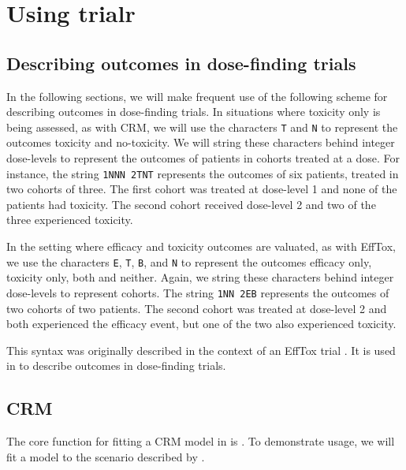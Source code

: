 \documentclass[article]{jss}
\begin{document}
\hypertarget{using-trialr}{%
\section{Using trialr}\label{using-trialr}}

\hypertarget{describing-outcomes-in-dose-finding-trials}{%
\subsection{Describing outcomes in dose-finding
trials}\label{describing-outcomes-in-dose-finding-trials}}

In the following sections, we will make frequent use of the following
scheme for describing outcomes in dose-finding trials. In situations
where toxicity only is being assessed, as with CRM, we will use the
characters \texttt{T} and \texttt{N} to represent the outcomes toxicity
and no-toxicity. We will string these characters behind integer
dose-levels to represent the outcomes of patients in cohorts treated at
a dose. For instance, the string \texttt{1NNN\ 2TNT} represents the
outcomes of six patients, treated in two cohorts of three. The first
cohort was treated at dose-level 1 and none of the patients had
toxicity. The second cohort received dose-level 2 and two of the three
experienced toxicity.

In the setting where efficacy and toxicity outcomes are valuated, as
with EffTox, we use the characters \texttt{E}, \texttt{T}, \texttt{B},
and \texttt{N} to represent the outcomes efficacy only, toxicity only,
both and neither. Again, we string these characters behind integer
dose-levels to represent cohorts. The string \texttt{1NN\ 2EB}
represents the outcomes of two cohorts of two patients. The second
cohort was treated at dose-level 2 and both experienced the efficacy
event, but one of the two also experienced toxicity.

This syntax was originally described in the context of an EffTox trial
\citep{Brock2017a}. It is used in  to describe outcomes in
dose-finding trials.

\hypertarget{crm-1}{%
\subsection{CRM}\label{crm-1}}

The core function for fitting a CRM model in  is
. To demonstrate usage, we will fit a model to the
scenario described by \citet[p.~21]{Cheung2011}.
\end{document}
